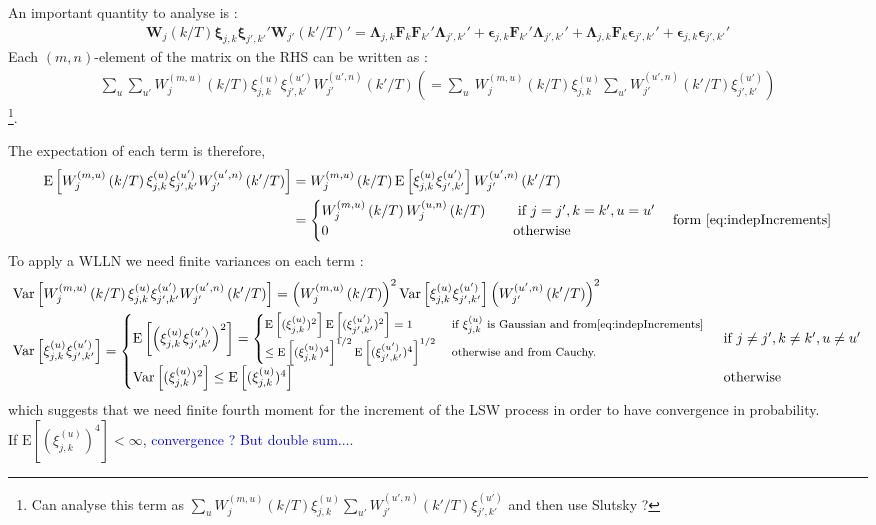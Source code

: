 \documentclass{article}
\numberwithin{equation}{section}
\let \oldsum \sum
\renewcommand{\sum}{\displaystyle \oldsum}
\newcommand{\W}[2]{\bm{W}_{#1}\left(#2/T\right)}
\newcommand{\eW}[4]{W_{#3}^{(#1,#2)}\left(#4/T\right)}
\newcommand{\increment}[2]{\bm{\xi}_{#1,#2}}
\newcommand{\eincrement}[3]{\xi_{#2,#3}^{(#1)}}
\newcommand{\E}[1]{\mathrm{E}\left[#1\right]}
\newcommand{\Var}[1]{\mathrm{Var}\left[#1\right]}
\newcommand{\loadings}[2]{\bm{\Lambda}_{#1,#2}}
\newcommand{\factors}[1]{\bm{F}_{#1}}
\newcommand{\idioError}[2]{\bm{\epsilon}_{#1,#2}}
\begin{document}
	An important quantity to analyse is : 
	\begin{align*}
		\W{j}{k}\increment{j}{k}\increment{j'}{k'}'\W{j'}{k'}' = \loadings{j}{k}\factors{k}\factors{k'}'\loadings{j'}{k'}' + \idioError{j}{k}\factors{k'}'\loadings{j'}{k'}' + \loadings{j}{k}\factors{k}\idioError{j'}{k'}' + \idioError{j}{k}\idioError{j'}{k'}'
	\end{align*}
	Each $(m,n)$-element of the matrix on the RHS can be written as : 
	\begin{align*}
		\sum_{u}\sum_{u'} \eW{m}{u}{j}{k}\eincrement{u}{j}{k}\eincrement{u'}{j'}{k'}\eW{u'}{n}{j'}{k'} \left(= \sum_{u}\ \eW{m}{u}{j}{k}\eincrement{u}{j}{k} \sum_{u'}\eW{u'}{n}{j'}{k'} \eincrement{u'}{j'}{k'}\right)
	\end{align*}
	\footnote{Can analyse this term as $\sum_u  \eW{m}{u}{j}{k}\eincrement{u}{j}{k} \sum_{u'} \eW{u'}{n}{j'}{k'}\eincrement{u'}{j'}{k'}$ and then use Slutsky ?}.

	The expectation of each term is therefore, 
	\begin{align*}
		\E{\eW{m}{u}{j}{k}\eincrement{u}{j}{k}\eincrement{u'}{j'}{k'}\eW{u'}{n}{j'}{k'}} &= \eW{m}{u}{j}{k}\E{\eincrement{u}{j}{k}\eincrement{u'}{j'}{k'}}\eW{u'}{n}{j'}{k'}\\
		&= \begin{cases}
			\eW{m}{u}{j}{k}\eW{u}{n}{j}{k} \quad &\text{ if } j=j',k=k',u=u'\\
			0  \quad & \text{otherwise}
		      \end{cases} \quad \text{form } \eqref{eq:indepIncrements}
	\end{align*}
	To apply a WLLN we need finite variances on each term :  
	\begin{align*}
		&\Var{\eW{m}{u}{j}{k}\eincrement{u}{j}{k}\eincrement{u'}{j'}{k'}\eW{u'}{n}{j'}{k'}} = \left(\eW{m}{u}{j}{k}\right)^{2}\Var{\eincrement{u}{j}{k}\eincrement{u'}{j'}{k'}}\left(\eW{u'}{n}{j'}{k'}\right)^{2}\\
		&\Var{\eincrement{u}{j}{k}\eincrement{u'}{j'}{k'}} = 
			\begin{cases}
				\E{\left(\eincrement{u}{j}{k}\eincrement{u'}{j'}{k'}\right)^{2}} = \footnotesize \begin{cases}
															\E{(\eincrement{u}{j}{k})^{2}}\E{(\eincrement{u'}{j'}{k'})^{2}} = 1 &\text{ if } \eincrement{u}{j}{k} \text{ is Gaussian and from}\eqref{eq:indepIncrements}\\ 			
															\leq \E{(\eincrement{u}{j}{k})^{4}}^{1/2}\E{(\eincrement{u'}{j'}{k'})^{4}}^{1/2}	&\text{ otherwise and from Cauchy. }			
														\end{cases} &\text{ if } j\neq j', k\neq k', u\neq u' \normalsize\\
				\Var{(\eincrement{u}{j}{k})^{2}} \leq \E{(\eincrement{u}{j}{k})^{4}} & \text{ otherwise }
			\end{cases}
	\end{align*}
	which suggests that we need finite fourth moment for the increment of the LSW process in order to have convergence in probability. \\
	If $\E{(\eincrement{u}{j}{k})^{4}}< \infty$, \textcolor{blue}{convergence ? But double sum...}.\\
	
\end{document}
